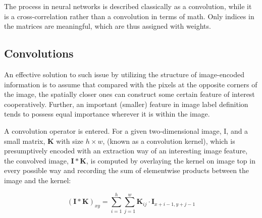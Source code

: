    The process in neural networks is described classically as a convolution, while it is a cross-correlation rather than a convolution in terms of math. Only indices in the matrices are meaningful, which are thus assigned with weights. 

    \subsection{Convolutions}
    An effective solution to such issue by utilizing the structure of image-encoded information is to assume that compared with the pixels at the opposite corners of the image, the spatially closer ones can construct some certain feature of interest cooperatively. Further, an important (smaller) feature in image label definition tends to possess equal importance wherever it is within the image. 

    A convolution operator is entered. For a given two-dimensional image, I, and a small matrix, $\pmb{K}$ with size $h \times w$, (known as a convolution kernel), which is presumptively encoded with an extraction way of an interesting image feature, the convolved image, $\pmb{I} * \pmb{K}$, is computed by overlaying the kernel on image top  in every possible way and recording the sum of elementwise products between the image and the kernel:

    \begin{equation}
        (\pmb{I} * \pmb{K})_{xy} = \sum_{i=1}^{h}\sum_{j=1}^{w} \pmb{K}_{ij}\cdot \pmb{I}_{x+i-1, y+j-1}
    \end{equation}

